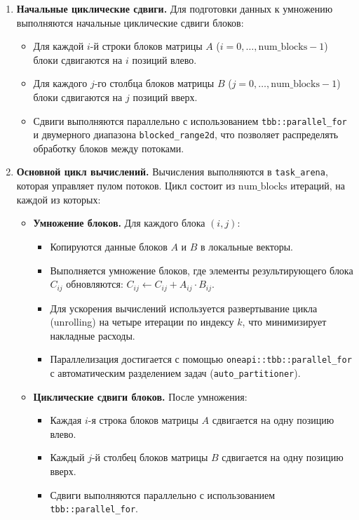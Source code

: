 \documentclass[a4paper,12pt]{article}
\begin{document}
\begin{enumerate}
    \item \textbf{Начальные циклические сдвиги.}
    Для подготовки данных к умножению выполняются начальные циклические сдвиги блоков:
    \begin{itemize}
        \item Для каждой \( i \)-й строки блоков матрицы \( A \) (\( i = 0, \dots, \text{num\_blocks} - 1 \)) блоки сдвигаются на \( i \) позиций влево.
        \item Для каждого \( j \)-го столбца блоков матрицы \( B \) (\( j = 0, \dots, \text{num\_blocks} - 1 \)) блоки сдвигаются на \( j \) позиций вверх.
        \item Сдвиги выполняются параллельно с использованием \texttt{tbb::parallel\_for} и двумерного диапазона \texttt{blocked\_range2d}, что позволяет распределять обработку блоков между потоками.
    \end{itemize}

    \item \textbf{Основной цикл вычислений.}
    Вычисления выполняются в \texttt{task\_arena}, которая управляет пулом потоков. Цикл состоит из \( \text{num\_blocks} \) итераций, на каждой из которых:
    \begin{itemize}
        \item \textbf{Умножение блоков.} Для каждого блока \( (i, j) \):
        \begin{itemize}
            \item Копируются данные блоков \( A \) и \( B \) в локальные векторы.
            \item Выполняется умножение блоков, где элементы результирующего блока \( C_{ij} \) обновляются: \( C_{ij} \gets C_{ij} + A_{ij} \cdot B_{ij} \).
            \item Для ускорения вычислений используется развертывание цикла (unrolling) на четыре итерации по индексу \( k \), что минимизирует накладные расходы.
            \item Параллелизация достигается с помощью \texttt{oneapi::tbb::parallel\_for} с автоматическим разделением задач (\texttt{auto\_partitioner}).
        \end{itemize}
        \item \textbf{Циклические сдвиги блоков.} После умножения:
        \begin{itemize}
            \item Каждая \( i \)-я строка блоков матрицы \( A \) сдвигается на одну позицию влево.
            \item Каждый \( j \)-й столбец блоков матрицы \( B \) сдвигается на одну позицию вверх.
            \item Сдвиги выполняются параллельно с использованием \texttt{tbb::parallel\_for}.
        \end{itemize}
    \end{itemize}
\end{enumerate}
\end{document}
